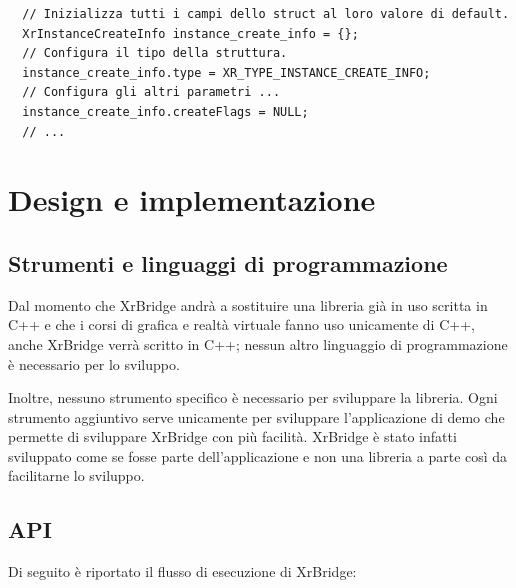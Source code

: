 \documentclass[twoside]{supsistudent}
\begin{document}
\begin{verbatim}
  // Inizializza tutti i campi dello struct al loro valore di default.
  XrInstanceCreateInfo instance_create_info = {};
  // Configura il tipo della struttura.
  instance_create_info.type = XR_TYPE_INSTANCE_CREATE_INFO;
  // Configura gli altri parametri ...
  instance_create_info.createFlags = NULL;
  // ...
\end{verbatim}

\chapter{Design e implementazione}

\section{Strumenti e linguaggi di programmazione}

Dal momento che XrBridge andrà a sostituire una libreria già in uso scritta in C++ e che i corsi di grafica e realtà virtuale fanno uso unicamente di C++, anche XrBridge verrà scritto in C++; nessun altro linguaggio di programmazione è necessario per lo sviluppo.

Inoltre, nessuno strumento specifico è necessario per sviluppare la libreria. Ogni strumento aggiuntivo serve unicamente per sviluppare l'applicazione di demo che permette di sviluppare XrBridge con più facilità. XrBridge è stato infatti sviluppato come se fosse parte dell'applicazione e non una libreria a parte così da facilitarne lo sviluppo.

\newpage

\section{API}

Di seguito è riportato il flusso di esecuzione di XrBridge:
\end{document}
